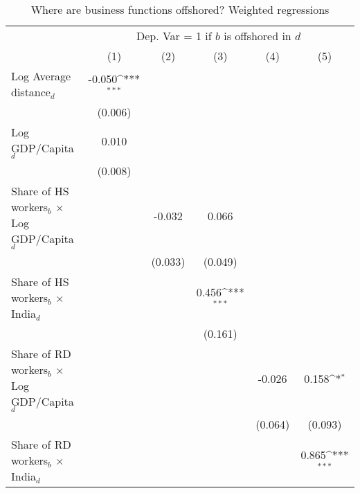 \begin{table}[htbp] \footnotesize \centering
\def\sym#1{\ifmmode^{#1}\else\(^{#1}\)\fi}
\caption{Where are business functions offshored? Weighted regressions \label{tab:reg_where_appendix}}
\renewcommand{\arraystretch}{1}
\begin{tabular}{l*{5}{c}}
\toprule
&\multicolumn{5}{c}{Dep. Var = 1 if $ b $ is offshored in $ d $} \\
\cmidrule(lr){2-6}
                &\multicolumn{1}{c}{(1)}         &\multicolumn{1}{c}{(2)}         &\multicolumn{1}{c}{(3)}         &\multicolumn{1}{c}{(4)}         &\multicolumn{1}{c}{(5)}         \\
\midrule
Log Average distance$ _d$&   -0.050\sym{***}&                  &                  &                  &                  \\
                &  (0.006)         &                  &                  &                  &                  \\
\addlinespace
Log GDP/Capita$ _d$&    0.010         &                  &                  &                  &                  \\
                &  (0.008)         &                  &                  &                  &                  \\
\addlinespace
Share of HS workers$ _b$ $\times$ Log GDP/Capita$ _d$&                  &   -0.032         &    0.066         &                  &                  \\
                &                  &  (0.033)         &  (0.049)         &                  &                  \\
\addlinespace
Share of HS workers$ _b$ $\times$ India$ _d$&                  &                  &    0.456\sym{***}&                  &                  \\
                &                  &                  &  (0.161)         &                  &                  \\
\addlinespace
Share of RD workers$ _b$ $\times$ Log GDP/Capita$ _d$&                  &                  &                  &   -0.026         &    0.158\sym{*}  \\
                &                  &                  &                  &  (0.064)         &  (0.093)         \\
\addlinespace
Share of RD workers$ _b$ $\times$ India$ _d$&                  &                  &                  &                  &    0.865\sym{***}\\

\end{tabular}
\end{table}
